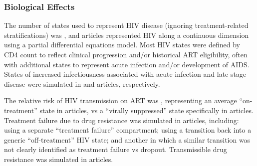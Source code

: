 \subsubsection{Biological Effects}
\label{sss:res:bio}
The \xdmdef number of states used to represent HIV disease
(ignoring treatment-related stratifications) was ,
and  articles represented HIV along a continuous dimension
using a partial differential equations model.
Most HIV states were defined by CD4 count %
to reflect clinical progression and/or historical ART eligibility,
often with additional states to represent acute infection and/or development of AIDS.
States of increased infectiousness associated with acute infection and late stage disease
were simulated in  and  articles, respectively.
\par
The relative risk of HIV transmission on ART was ,
representing an average ``on-treatment'' state in  articles,
vs a ``virally suppressed'' state specifically in  articles.
Treatment failure due to drug resistance was simulated in  articles, including:
 using a separate ``treatment failure'' compartment;
 using a transition back into a generic ``off-treatment'' HIV state; and another
 in which a similar transition  was not clearly identified as treatment failure vs dropout.
Transmissible drug resistance was simulated in  articles.
